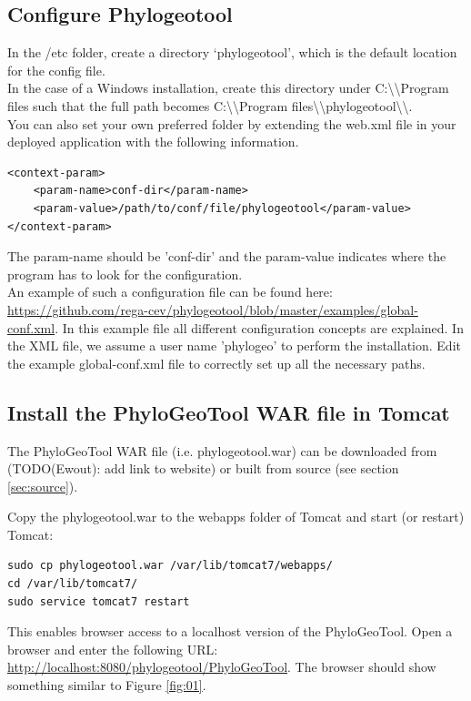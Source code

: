 \documentclass[a4paper, 11pt]{article} %
\begin{document}
\subsection{Configure Phylogeotool} \label{sssec:config_file}

In the /etc folder, create a directory `phylogeotool', which is the default location for the config file. 
\\
In the case of a Windows installation, create this directory under C:\textbackslash \textbackslash Program files such that the full path becomes C:\textbackslash \textbackslash Program files\textbackslash \textbackslash phylogeotool\textbackslash \textbackslash.
\\
You can also set your own preferred folder by extending the web.xml file in your deployed application with the following information.

\begin{verbatim}
<context-param>
    <param-name>conf-dir</param-name>
    <param-value>/path/to/conf/file/phylogeotool</param-value>
</context-param>
\end{verbatim}

The param-name should be 'conf-dir' and the param-value indicates where the program has to look for the configuration.
\\
An example of such a configuration file can be found here: \url{https://github.com/rega-cev/phylogeotool/blob/master/examples/global-conf.xml}. In this example file all different configuration concepts are explained.
In the XML file, we assume a user name 'phylogeo' to perform the installation.
Edit the example global-conf.xml file to correctly set up all the necessary paths.


\subsection{Install the PhyloGeoTool WAR file in Tomcat}
The PhyloGeoTool WAR file (i.e. phylogeotool.war) can be downloaded from (TODO(Ewout): add link to website) or built from source (see section \ref{sec:source}). 

Copy the phylogeotool.war to the webapps folder of Tomcat and start (or restart) Tomcat:
\begin{verbatim}
sudo cp phylogeotool.war /var/lib/tomcat7/webapps/
cd /var/lib/tomcat7/
sudo service tomcat7 restart
\end{verbatim}
This enables browser access to a localhost version of the PhyloGeoTool.
Open a browser and enter the following URL: \url{http://localhost:8080/phylogeotool/PhyloGeoTool}.
The browser should show something similar to Figure \ref{fig:01}.
\end{document}
